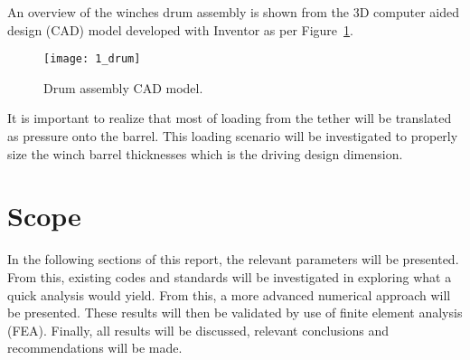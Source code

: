 An overview of the winches drum assembly is shown from the 3D computer aided design (CAD) model developed with Inventor \cite{INVENTOR} as per Figure~\ref{fig:1_drum}.
\begin{figure}[H]
    \centering
    \texttt{[image: 1\_drum]}
    \caption{Drum assembly CAD model.}
    \label{fig:1_drum}
\end{figure}

It is important to realize that most of loading from the tether will be translated as pressure onto the barrel. This loading scenario will be investigated to properly size the winch barrel thicknesses which is the driving design dimension.

\section{Scope} %

In the following sections of this report, the relevant parameters will be presented. From this, existing codes and standards will be investigated in exploring what a quick analysis would yield. From this, a more advanced numerical approach will be presented. These results will then be validated by use of finite element analysis (FEA). Finally, all results will be discussed, relevant conclusions and recommendations will be made.
